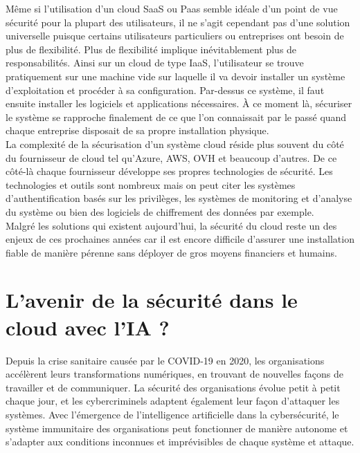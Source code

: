 \documentclass[a4paper, 12pt]{article}
\begin{document}
\begin{spacing}{1.1}
      Même si l'utilisation d'un cloud SaaS ou Paas semble idéale d'un point
      de vue sécurité pour la plupart des utilisateurs, il ne s'agit cependant
      pas d'une solution universelle puisque certains utilisateurs particuliers
      ou entreprises ont besoin de plus de flexibilité. Plus de flexibilité
      implique inévitablement plus de responsabilités. Ainsi sur un cloud de
      type IaaS, l'utilisateur se trouve pratiquement sur une machine vide sur
      laquelle il va devoir installer un système d'exploitation et procéder à
      sa configuration. Par-dessus ce système, il faut ensuite installer les
      logiciels et applications nécessaires. À ce moment là, sécuriser le
      système se rapproche finalement de ce que l'on connaissait par le passé
      quand chaque entreprise disposait de sa propre installation physique. \\

      La complexité de la sécurisation d'un système cloud réside plus souvent
      du côté du fournisseur de cloud tel qu'Azure, AWS, OVH et beaucoup
      d'autres. De ce côté-là chaque fournisseur développe ses propres
      technologies de sécurité. Les technologies et outils sont nombreux mais
      on peut citer les systèmes d'authentification basés sur les privilèges,
      les systèmes de monitoring et d'analyse du système ou bien des logiciels
      de chiffrement des données par exemple. \\

      Malgré les solutions qui existent aujourd'hui, la sécurité du cloud
      reste un des enjeux de ces prochaines années car il est encore difficile
      d'assurer une installation fiable de manière pérenne sans déployer de
      gros moyens financiers et humains.

  \section{L'avenir de la sécurité dans le cloud avec l'IA ?}
    Depuis la crise sanitaire causée par le COVID-19 en 2020, les organisations
    accélèrent leurs transformations numériques, en trouvant de nouvelles façons
    de travailler et de communiquer. La sécurité des organisations évolue petit
    à petit chaque jour, et les cybercriminels adaptent également leur façon
    d'attaquer les systèmes. Avec l’émergence de l'intelligence artificielle
    dans la cybersécurité, le système immunitaire des organisations peut
    fonctionner de manière autonome et s'adapter aux conditions inconnues et
    imprévisibles de chaque système et attaque.


\end{spacing}
\end{document}
